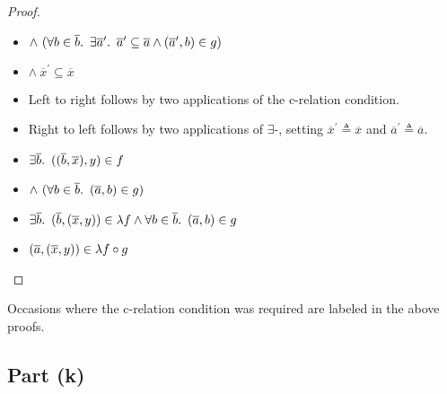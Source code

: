 \begin{prop}
\begin{proof}
\begin{itemize}
    \addtolength{\itemsep}{-.3\baselineskip}
    \item[\phantom{\imps}]
      \quad$\land~(\forall b\in\overline{b}\ldotp~\exists\overline{a}^\prime\ldotp~\overline{a}^\prime\subseteq\overline{a}\land(\overline{a}^\prime,b)\in g)$

    \item[\phantom{\imps}]
      \quad$\land~\overline{x}^\prime\subseteq\overline{x}$
    \addtolength{\itemsep}{.3\baselineskip}

    \item[\phantom{\imps}]
      Left to right follows by two applications of the c-relation condition.

    \item[\phantom{\imps}]
      Right to left follows by two applications of $\exists$-\Intro, setting $\overline{x}^\prime\triangleq\overline{x}$ and $\overline{a}^\prime\triangleq\overline{a}$.

    \item[\iffs]
      $\exists\overline{b}\ldotp~((\overline{b},\overline{x}),y)\in f$

    \addtolength{\itemsep}{-.3\baselineskip}
    \item[\phantom{\imps}]
      \quad$\land~(\forall b\in\overline{b}\ldotp~(\overline{a},b)\in g)$
    \addtolength{\itemsep}{.3\baselineskip}

    \item[\iffs]
      $\exists\overline{b}\ldotp~(\overline{b},(\overline{x},y))\in \lambda f\land\forall b\in\overline{b}\ldotp~(\overline{a},b)\in g$
     \marginnote{\Def-$\lambda\cdot$}

    \item[\iffs]
      $(\overline{a},(\overline{x},y))\in\lambda f\circ g$
      \qedhere
    \end{itemize}
  \end{proof}
\end{prop}

Occasions where the c-relation condition was required are labeled in the above proofs.

\subsection{Part (k)}\label{sec:q-2-k}

